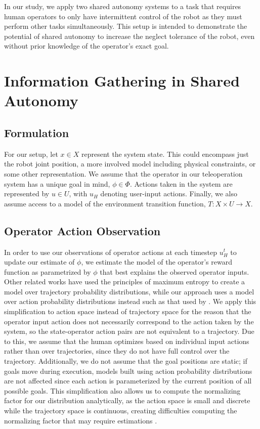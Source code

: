 \documentclass[conference]{IEEEtran}
\begin{document}
In our study, we apply two shared autonomy systems to a task that requires human operators to only have intermittent control of the robot as they must perform other tasks simultaneously. This setup is intended to demonstrate the potential of shared autonomy to increase the neglect tolerance of the robot, even without prior knowledge of the operator's exact goal.

\section{Information Gathering in Shared Autonomy}
\subsection{Formulation}

For our setup, let $ x \in X $ represent the system state. This could encompass just the robot joint position, a more involved model including physical constraints, or some other representation. We assume that the operator in our teleoperation system has a unique goal in mind, $\phi \in \Phi$. Actions taken in the system are represented by $ u \in U $, with $u_H$ denoting user-input actions. Finally, we also assume access to a model of the environment transition function, $T: X \times U \rightarrow X$.

\subsection{Operator Action Observation}
In order to use our observations of operator actions at each timestep $u_H^t$ to update our estimate of $\phi$, we estimate the model of the operator's reward function as parametrized by $\phi$ that best explains the observed operator inputs. Other related works \cite{dragan2012formalizing, javdani2015shared} have used the principles of maximum entropy \cite{ziebart2008maximum} to create a model over trajectory probability distributions, while our approach uses a model over action probability distributions instead such as that used by \citet{ramachandran2007bayesian}. We apply this simplification to action space instead of trajectory space for the reason that the operator input action does not necessarily correspond to the action taken by the system, so the state-operator action pairs are not equivalent to a trajectory. Due to this, we assume that the human optimizes based on individual input actions rather than over trajectories, since they do not have full control over the trajectory. Additionally, we do not assume that the goal positions are static; if goals move during execution, models built using action probability distributions are not affected since each action is parameterized by the current position of all possible goals. This simplification also allows us to compute the normalizing factor for our distribution analytically, as the action space is small and discrete while the trajectory space is continuous, creating difficulties computing the normalizing factor that may require estimations \cite{javdani2015shared}.
\end{document}
